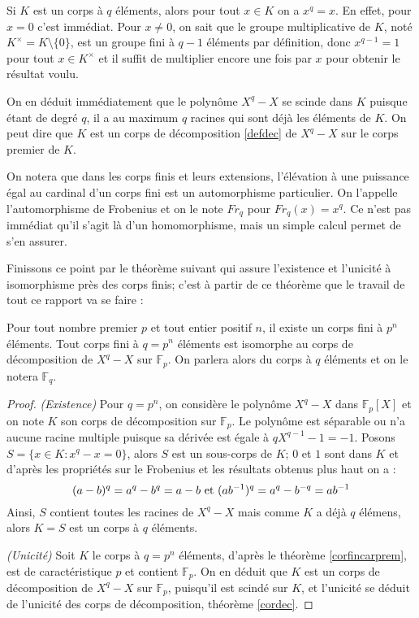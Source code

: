 \documentclass[a4paper]{article} %
\numberwithin{equation}{section}
\newcommand\GF[1]{\mathbb{F}_{#1}}
\begin{document}
Si $K$ est un corps à $q$ éléments, alors pour tout $x\in K$ on a $x^q = x$. En
effet, pour $x = 0$ c'est immédiat. Pour $x\neq 0$, on sait que le groupe
multiplicative de $K$, noté $K^{\times} = K\setminus\lbrace0\rbrace$, est un
groupe fini à $q-1$ éléments par définition, donc $x^{q-1} = 1$ pour tout $x\in
K^{\times}$ et il suffit de multiplier encore une fois par $x$ pour obtenir le
résultat voulu.\par
On en déduit immédiatement que le polynôme $X^q - X$ se scinde dans $K$
puisque étant de degré $q$, il a au maximum $q$ racines qui sont déjà les
éléments de $K$. On peut dire que $K$ est un corps de décomposition
\ref{defdec} de $X^q - X$ sur le corps premier de
$K$.\par
On notera que dans les corps finis et leurs extensions, l'élévation à une
puissance égal au cardinal d'un corps fini est un automorphisme particulier. On
l'appelle l'automorphisme de Frobenius et on le note $Fr_q$ pour $Fr_q(x) =
x^q$. Ce n'est pas immédiat qu'il s'agit là d'un homomorphisme, mais un simple
calcul permet de s'en assurer.\\\par
Finissons ce point par le théorème suivant qui assure l'existence et l'unicité
à isomorphisme près des corps finis; c'est à partir de ce théorème que le
travail de tout ce rapport va se faire :

\begin{thm}
Pour tout nombre premier $p$ et tout entier positif $n$, il existe un corps
fini à $p^n$ éléments. Tout corps fini à $q = p^n$ éléments est isomorphe au
corps de décomposition de $X^q - X$ sur $\GF{p}$. On parlera alors du corps à
$q$ éléments et on le notera $\GF{q}$.
\end{thm}
\begin{proof}
\textit{(Existence)} Pour $q = p^n$, on considère le polynôme $X^q - X$ dans 
$\GF{p}[X]$ et on note $K$ son corps de décomposition sur $\GF{p}$. Le polynôme 
est séparable ou n'a aucune racine multiple puisque sa dérivée est égale à $qX^{q-1}
- 1 = -1$. Posons $S = \lbrace x\in K : x^q - x = 0\rbrace$, alors $S$ est un 
sous-corps de $K$; $0$ et $1$ sont dans $K$ et d'après les propriétés sur le 
Frobenius et les résultats obtenus plus haut on a :
\[(a - b)^q = a^q - b^q = a - b \textup{ et }(ab^{-1})^q = a^q - b^{-q} =
ab^{-1}\]
Ainsi, $S$ contient toutes les racines de $X^q - X$ mais comme $K$ a déjà $q$
élémens, alors $K = S$ est un corps à $q$ éléments.\par
\textit{(Unicité)} Soit $K$ le corps à $q = p^n$ éléments, d'après le théorème
\ref{corfincarprem}, est de caractéristique $p$ et contient $\GF{p}$. On en
déduit que $K$ est un corps de décomposition de $X^q - X$ sur $\GF{p}$,
puisqu'il est scindé sur $K$, et l'unicité se déduit de l'unicité des corps de
décomposition, théorème \ref{cordec}.
\end{proof}
\end{document}
